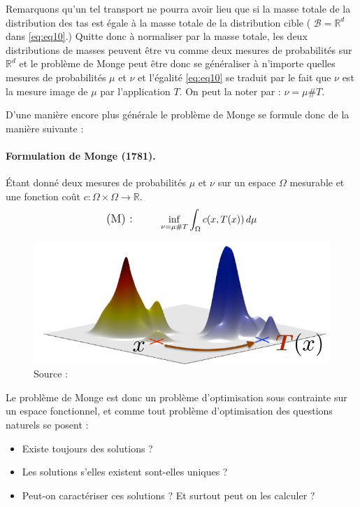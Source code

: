 \documentclass[
    8.2pt,
    a4paper,
    logo,
    twocolumn
]{template}
\begin{document}
    Remarquons qu’un tel transport ne pourra avoir lieu que si la masse totale de la distribution des tas est égale à la masse totale de la distribution cible ( $\mathcal{B}=\mathbb{R}^d$ dans \ref{eq:eq10}.) Quitte donc à normaliser par la masse totale, les deux distributions de masses peuvent être vu comme deux mesures de probabilités sur $\mathbb{R}^d$ et le problème de Monge peut être donc se généraliser à n’importe quelles mesures de probabilités $\mu$ et $\nu$ et l’égalité \ref{eq:eq10} se traduit par le fait que $\nu$ est la mesure image de $\mu$ par l’application $T$. On peut la noter par : $\nu =  \mu \# T$.

    D’une manière encore plus générale le problème de Monge se formule donc de la manière suivante :

    \paragraph{Formulation de Monge (1781).}
    Étant donné deux mesures de probabilités $\mu$ et $\nu$ sur un espace $\Omega$ mesurable et une fonction coût $c : \Omega \times \Omega \rightarrow \mathbb{R}$.
    \begin{align*}
        \text{\large{(M) : \qquad}}
            \inf_{\nu = \mu \# T} \int_{\Omega} c(x, T(x)) \,d\mu \\
    \end{align*}
    \begin{figure}[H]
        \centering
        \includegraphics[width=.5\textwidth]{figures/Image2.png}
        \caption{Source : \citep{cuturi_fast_nodate}}
        \label{fig:update}
    \end{figure}
    Le problème de Monge est donc un problème d’optimisation sous contrainte sur un espace fonctionnel, et comme tout problème d’optimisation des questions naturels se posent :
    \begin{itemize}
        \item Existe toujours des solutions ?
        \item Les solutions s’elles existent sont-elles uniques ?
        \item Peut-on caractériser ces solutions ? Et surtout peut on les calculer ?
    \end{itemize}
\end{document}

